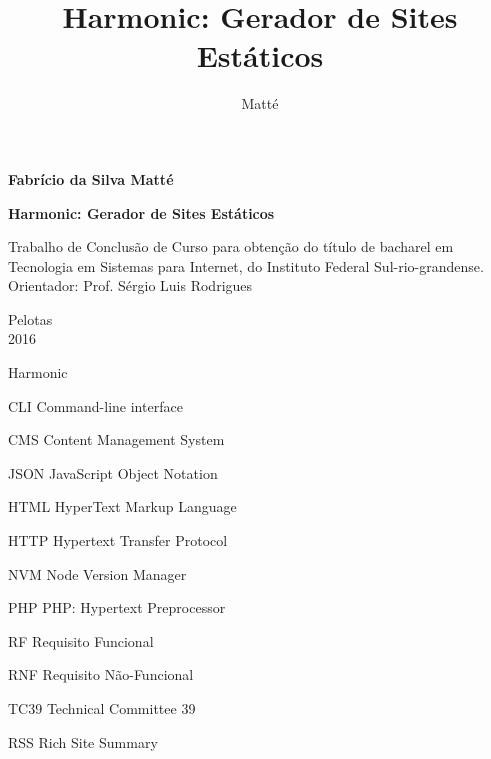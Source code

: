 \documentclass[ppginf, pep]{esinucpel}
\title{Harmonic: Gerador de Sites Estáticos}
\author{Matté}{Fabrício da Silva}
\begin{document}

\maketitle
\sloppy

\newpage

\begin{center}
    \large{\textbf{Fabrício da Silva Matté}}
    
    \vspace{8cm}
    
    \LARGE{\textbf{Harmonic: Gerador de Sites Estáticos}}
\end{center}

\vspace{1cm}

\begin{addmargin}[8cm]{0cm}
Trabalho de Conclusão de Curso para obtenção do título de bacharel em Tecnologia em Sistemas para Internet, do Instituto Federal Sul-rio-grandense.
\vspace{5pt}\\Orientador: Prof. Sérgio Luis Rodrigues
\end{addmargin}

\vspace{6cm}
\begin{center}
\large{Pelotas
\\2016}
\end{center}



\tableofcontents

\listoffigures

\listoftables

\begin{listofabbrv}{Harmonic}
    \item[CLI] Command-line interface
    \item[CMS] Content Management System
    \item[JSON] JavaScript Object Notation
    \item[HTML] HyperText Markup Language
    \item[HTTP] Hypertext Transfer Protocol
    \item[NVM] Node Version Manager
    \item[PHP] PHP: Hypertext Preprocessor
    \item[RF] Requisito Funcional
    \item[RNF] Requisito Não-Funcional
    \item[TC39] Technical Committee 39
    \item[RSS] Rich Site Summary
\end{listofabbrv}
\end{document}
